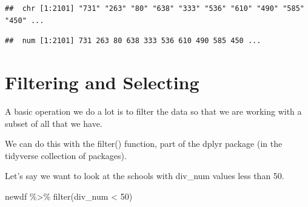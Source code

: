 \documentclass[
]{book}
\newenvironment{Shaded}{\begin{snugshade}}{\end{snugshade}}
\newcommand{\DecValTok}[1]{\textcolor[rgb]{0.00,0.00,0.81}{#1}}
\newcommand{\FunctionTok}[1]{\textcolor[rgb]{0.00,0.00,0.00}{#1}}
\newcommand{\NormalTok}[1]{#1}
\newcommand{\SpecialCharTok}[1]{\textcolor[rgb]{0.00,0.00,0.00}{#1}}
\begin{document}
\begin{verbatim}
##  chr [1:2101] "731" "263" "80" "638" "333" "536" "610" "490" "585" "450" ...
\end{verbatim}

\begin{Shaded}
\end{Shaded}

\begin{verbatim}
##  num [1:2101] 731 263 80 638 333 536 610 490 585 450 ...
\end{verbatim}

\hypertarget{filtering-and-selecting}{%
\section{Filtering and Selecting}\label{filtering-and-selecting}}

A basic operation we do a lot is to filter the data so that we are working with a subset of all that we have.

We can do this with the filter() function, part of the dplyr package (in the tidyverse collection of packages).

Let's say we want to look at the schools with div\_num values less than 50.

\begin{Shaded}
\begin{Highlighting}[]
\NormalTok{newdf }\SpecialCharTok{\%\textgreater{}\%} \FunctionTok{filter}\NormalTok{(div\_num }\SpecialCharTok{\textless{}} \DecValTok{50}\NormalTok{)}
\end{Highlighting}
\end{Shaded}
\end{document}
